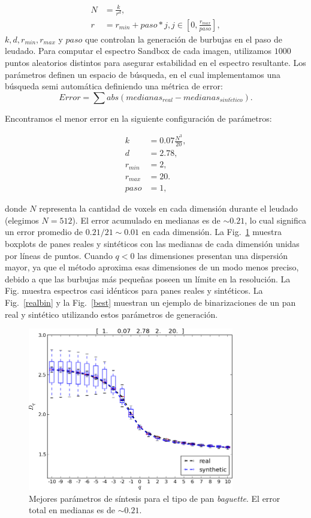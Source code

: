 \begin{align*}
N &= \frac{k}{r^{d}},\\ r &= r_{min}+paso*j, j \in [0,\frac{r_{max}}{paso}],
\end{align*}
\noindent $k,d,r_{min},r_{max}$ y $paso$ que controlan la generación de burbujas en el paso de leudado.
Para computar el espectro Sandbox de cada imagen, utilizamos $1000$ puntos aleatorios distintos para asegurar estabilidad en el espectro resultante.
Los parámetros definen un espacio de búsqueda, en el cual implementamos una búsqueda semi automática definiendo una métrica de error:
\begin{equation*}
Error = \displaystyle \sum abs(medianas_{real}-medianas_{sint\acute{e}tico}).
\end{equation*}

Encontramos el menor error en la siguiente configuración de parámetros:

\begin{align*}
k &= 0.07 \frac{N^{3}}{20} ,\\
d &=2.78,\\
r_{min} &=2,\\
r_{max} &=20.\\
paso &=1,
\end{align*}

\noindent donde $N$ representa la cantidad de voxels en cada dimensión durante el leudado (elegimos $N = 512$). 
El error acumulado en medianas es de $\sim 0.21$, lo cual significa un error promedio de $0.21/21 \sim 0.01$ en cada dimensión.
La Fig.~\ref{bestboxplot} muestra boxplots de panes reales y sintéticos con las medianas de cada dimensión unidas por líneas de puntos.
Cuando $q < 0$ las dimensiones presentan una dispersión mayor, ya que el método aproxima esas dimensiones de un modo menos preciso, debido a que las burbujas más pequeñas poseen un límite en la resolución.
La Fig. muestra espectros casi idénticos para panes reales y sintéticos.
La Fig.~\ref{realbin} y la Fig.~\ref{best} muestran un ejemplo de binarizaciones de un pan real y sintético utilizando estos parámetros de generación.


\begin{figure}[!ht]
\includegraphics[width=9cm]{figures/bestboxplot}
\caption[Mejores parámetros de síntesis para el tipo de pan {\em baguette}]{Mejores parámetros de síntesis para el tipo de pan {\em baguette}. El error total en medianas es de $\sim 0.21$.}
\label{bestboxplot}
\end{figure}

